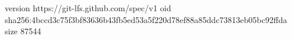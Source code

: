 version https://git-lfs.github.com/spec/v1
oid sha256:4bccd3c75f3bf83636b43fb5ed53a5f220d78ef88a85ddc73813eb05bc92ffda
size 87544

